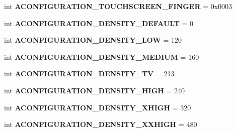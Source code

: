 \begin{DoxyCompactItemize}
\item 
\mbox{\label{classconfiguration_1_1AConfiguration_aab112619933d48de576501688e60616f}} 
int {\bfseries A\+C\+O\+N\+F\+I\+G\+U\+R\+A\+T\+I\+O\+N\+\_\+\+T\+O\+U\+C\+H\+S\+C\+R\+E\+E\+N\+\_\+\+F\+I\+N\+G\+ER} = 0x0003
\item 
\mbox{\label{classconfiguration_1_1AConfiguration_ad8bdf0f5da61f6ea18f1687aa98287c4}} 
int {\bfseries A\+C\+O\+N\+F\+I\+G\+U\+R\+A\+T\+I\+O\+N\+\_\+\+D\+E\+N\+S\+I\+T\+Y\+\_\+\+D\+E\+F\+A\+U\+LT} = 0
\item 
\mbox{\label{classconfiguration_1_1AConfiguration_a4fa1b11057160ab02d526217da6eec28}} 
int {\bfseries A\+C\+O\+N\+F\+I\+G\+U\+R\+A\+T\+I\+O\+N\+\_\+\+D\+E\+N\+S\+I\+T\+Y\+\_\+\+L\+OW} = 120
\item 
\mbox{\label{classconfiguration_1_1AConfiguration_a88b1aadf903065162bceebe11480463f}} 
int {\bfseries A\+C\+O\+N\+F\+I\+G\+U\+R\+A\+T\+I\+O\+N\+\_\+\+D\+E\+N\+S\+I\+T\+Y\+\_\+\+M\+E\+D\+I\+UM} = 160
\item 
\mbox{\label{classconfiguration_1_1AConfiguration_ae3fad624205116cf756ae3f354690fda}} 
int {\bfseries A\+C\+O\+N\+F\+I\+G\+U\+R\+A\+T\+I\+O\+N\+\_\+\+D\+E\+N\+S\+I\+T\+Y\+\_\+\+TV} = 213
\item 
\mbox{\label{classconfiguration_1_1AConfiguration_af7fbd42dc0987513e869509ffab2001a}} 
int {\bfseries A\+C\+O\+N\+F\+I\+G\+U\+R\+A\+T\+I\+O\+N\+\_\+\+D\+E\+N\+S\+I\+T\+Y\+\_\+\+H\+I\+GH} = 240
\item 
\mbox{\label{classconfiguration_1_1AConfiguration_aa2ab81dc511e7240e6105b00a99a8718}} 
int {\bfseries A\+C\+O\+N\+F\+I\+G\+U\+R\+A\+T\+I\+O\+N\+\_\+\+D\+E\+N\+S\+I\+T\+Y\+\_\+\+X\+H\+I\+GH} = 320
\item 
\mbox{\label{classconfiguration_1_1AConfiguration_a038bb49e9215cb7be733dd7ebbbd67ac}} 
int {\bfseries A\+C\+O\+N\+F\+I\+G\+U\+R\+A\+T\+I\+O\+N\+\_\+\+D\+E\+N\+S\+I\+T\+Y\+\_\+\+X\+X\+H\+I\+GH} = 480

\end{DoxyCompactItemize}

